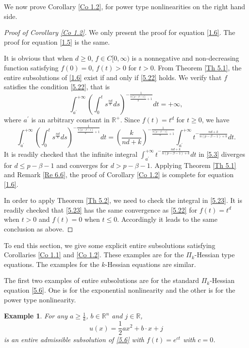 \documentclass[a4paper,11pt]{amsart}
\theoremstyle{plain}
\newtheorem{Example}{Example}[section]
\theoremstyle{remark}
\numberwithin{equation}{section}
\numberwithin{figure}{section}
\numberwithin{remark}{section}
\begin{document}
\begin{sloppypar}
We now prove Corollary \ref{Co 1.2}, for power type nonlinearities on the right hand side.
\begin{proof}[Proof of Corollary \ref{Co 1.2}]
We only present the proof for equation \eqref{1.6}. The proof for equation \eqref{1.5} is the same.

It is obvious that when $d\geq0$, $f\in C[0, \infty)$ is a nonnegative and non-decreasing function satisfying $f(0)=0$, $f(t)>0$ for $t>0$.
From Theorem \ref{Th 5.1}, the entire subsolutions of \eqref{1.6} exist if and only if \eqref{5.22} holds.
We verify that $f$ satisfies the condition \eqref{5.22}, that is
\begin{equation}\label{5.2}
	\int_{a^\prime}^{+\infty}\left( \int_{0}^{t}s^{\frac{nd}{k}}ds\right) ^{-\frac{1}{\frac{n(p-\beta -1)}{k}+1}}dt=+\infty,
\end{equation}where $a^\prime$ is an arbitrary constant in $\mathbb{R^+}$.
Since $f(t)=t^d$ for $t\geq0$, we have
\begin{equation}\label{5.3}
	\int_{a^\prime}^{+\infty}\left( \int_{0}^{t}s^{\frac{nd}{k}}ds\right) ^{-\frac{1}{\frac{n(p-\beta -1)}{k}+1}}dt
	=\left(\frac{k}{nd+k}\right) ^{-\frac{1}{\frac{n(p-\beta -1)}{k}+1}}\int_{a^\prime}^{+\infty} t^{-\frac{nd+k}{n(p-\beta-1)+k}} dt.
\end{equation}
It is readily checked that the infinite integral $\int_{a^\prime}^{+\infty} t^{-\frac{nd+k}{n(p-\beta -1)+k}} dt$ in \eqref{5.3} diverges for $d\le p-\beta-1$ and converges for $d>p-\beta-1$.
Applying Theorem \ref{Th 5.1} and Remark \ref{Re 6.6}, the proof of Corollary \ref{Co 1.2} is complete for equation \eqref{1.6}.

\vspace{1mm}

In order to apply Theorem \ref{Th 5.2}, we need to check the integral in \eqref{5.23}. It is readily checked that \eqref{5.23} has the same convergence as \eqref{5.22} for $f(t)=t^d$ when $t>0$ and $f(t)=0$ when $t\le 0$. Accordingly it leads to the same conclusion as above.
\end{proof}

To end this section, we give some explicit entire subsolutions satisfying Corollaries \ref{Co 1.1} and \ref{Co 1.2}. 
These examples are for the $\Pi_k$-Hessian type equations. The examples for the $k$-Hessian equations are similar.

The first two examples of entire subsolutions are for the standard $\Pi_k$-Hessian equation \eqref{5.6}. One is for the exponential nonlinearity and the other is for the  power type nonlinearity.
\begin{Example}\label{Example 6.1}
For any $a \ge \frac{1}{k}$, $b\in \mathbb{R}^n$ and $j\in \mathbb{R}$, 
\begin{equation}\label{example1}
u(x)=\frac{1}{2}a x^2 + b\cdot x + j
\end{equation} 
is an entire admissible subsolution of \eqref{5.6} with $f(t)=e^{c t}$ with $c=0$.
\end{Example}


\end{sloppypar}
\end{document}
